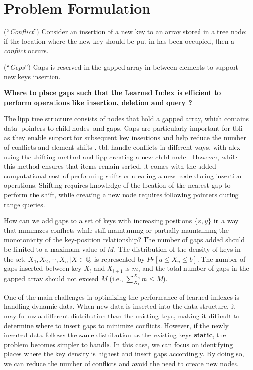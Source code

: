 \chapter{Problem Formulation}
\begin{definition}
 (``\emph{Conflict}'') Consider an insertion of a new key to an array stored in a tree node; if the location where the new key should be put in has been occupied, then a \emph{conflict} occurs.
\label{def:conflict}
\end{definition}
\begin{definition}
(``\emph{Gaps}'') Gaps is reserved in the gapped array in between elements to support new keys insertion.  
\label{def:gap}
\end{definition}

\textbf{Where to place gaps such that the Learned Index is efficient to perform operations like insertion, deletion and query ?}
 
 The \acrfull{lipp} tree structure consists of nodes that hold a gapped array, which contains data, pointers to child nodes, and gaps. Gaps are particularly important for \acrfull{tbli} as they enable support for subsequent key insertions and help reduce the number of conflicts and element shifts \cite{ALEX,PGM,fittingtree,LIPP}. \acrshort{tbli} handle conflicts in different ways, with \acrshort{alex} using the shifting method \cite{ALEX} and \acrshort{lipp} creating a new child node \cite{LIPP}. However, while this method ensures that items remain sorted, it comes with the added computational cost of performing shifts or creating a new node during insertion operations. Shifting requires knowledge of the location of the nearest gap to perform the shift, while creating a new node requires following pointers during range queries.

How can we add gaps to a set of keys with increasing positions $\{x, y\}$ in a way that minimizes conflicts while still maintaining or partially maintaining the monotonicity of the key-position relationship? The number of gaps added should be limited to a maximum value of $M$. The distribution of the density of keys in the set, ${X_1, X_2, \cdots, X_n\ | X \in \mathbb{Q}}$, is represented by $Pr[a \leq X_n \leq b]$. The number of gaps inserted between key $X_i$ and $X_{i+1}$ is $m$, and the total number of gaps in the gapped array should not exceed $M$ (i.e., $\sum_{X_1}^{X_n}{m} \leq M$).

One of the main challenges in optimizing the performance of learned indexes is handling dynamic data. When new data is inserted into the data structure, it may follow a different distribution than the existing keys, making it difficult to determine where to insert gaps to minimize conflicts. However, if the newly inserted data follows the same distribution as the existing keys \textbf{static}, the problem becomes simpler to handle. In this case, we can focus on identifying places where the key density is highest and insert gaps accordingly. By doing so, we can reduce the number of conflicts and avoid the need to create new nodes.

